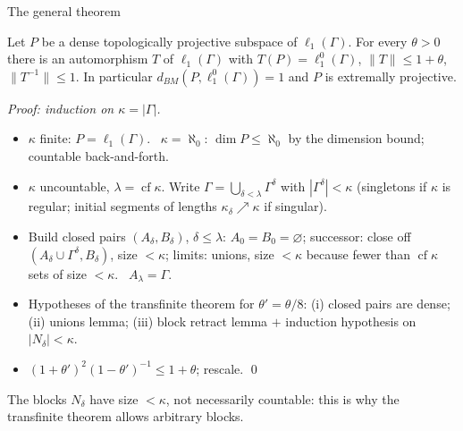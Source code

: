 \documentclass[10pt,aspectratio=169]{beamer}
\newcommand{\lo}[1]{\ell_1^0(#1)}
\newcommand{\ellone}[1]{\ell_1(#1)}
\newcommand{\cf}{\operatorname{cf}}
\newcommand{\BM}{d_{BM}}
\begin{document}
\begin{frame}{The general theorem}
  \begin{theorem}
    Let $P$ be a dense topologically projective subspace of $\ellone\Gamma$. For
    every $\theta>0$ there is an automorphism $T$ of $\ellone\Gamma$ with
    $T(P)=\lo\Gamma$, $\|T\|\le1+\theta$, $\|T^{-1}\|\le1$. In particular
    $\BM(P,\lo\Gamma)=1$ and $P$ is extremally projective.
  \end{theorem}
  \textit{Proof: induction on $\kappa=|\Gamma|$.}
  \begin{itemize}
    \item $\kappa$ finite: $P=\ellone\Gamma$. \ $\kappa=\aleph_0$: $\dim P\le\aleph_0$
      by the dimension bound; countable back-and-forth.
    \item $\kappa$ uncountable, $\lambda=\cf\kappa$. Write
      $\Gamma=\bigcup_{\delta<\lambda}\Gamma^\delta$ with $|\Gamma^\delta|<\kappa$
      (singletons if $\kappa$ is regular; initial segments of lengths
      $\kappa_\delta\nearrow\kappa$ if singular).
    \item Build closed pairs $(A_\delta,B_\delta)$, $\delta\le\lambda$:
      $A_0=B_0=\varnothing$; successor: close off $(A_\delta\cup\Gamma^\delta,B_\delta)$,
      size $<\kappa$; limits: unions, size $<\kappa$ because fewer than
      $\cf\kappa$ sets of size $<\kappa$. \ $A_\lambda=\Gamma$.
    \item Hypotheses of the transfinite theorem for $\theta'=\theta/8$:
      (i) closed pairs are dense; (ii) unions lemma; (iii) block retract lemma
      $+$ induction hypothesis on $|N_\delta|<\kappa$.
    \item ${(1+\theta')}^2{(1-\theta')}^{-1}\le1+\theta$; rescale. \qed
  \end{itemize}
  The blocks $N_\delta$ have size $<\kappa$, not necessarily countable: this is
  why the transfinite theorem allows arbitrary blocks.
\end{frame}
\end{document}

